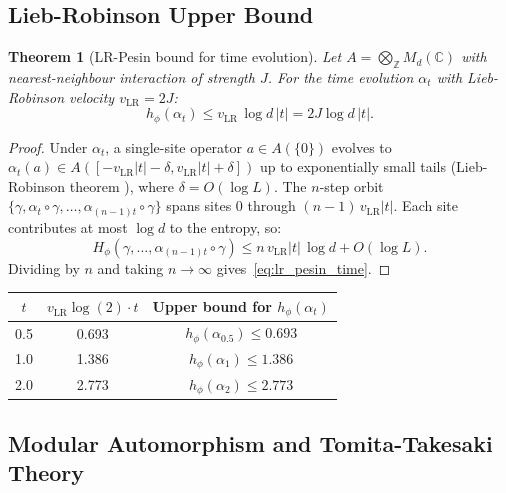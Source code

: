 \documentclass[12pt,a4paper]{article}
\newtheorem{theorem}{Theorem}[section]
\newcommand{\CC}{\mathbb{C}}
\newcommand{\ZZ}{\mathbb{Z}}
\newcommand{\Md}{M_d(\CC)}
\newcommand{\Hphi}{H_{\phi}}
\begin{document}
\subsection{Lieb-Robinson Upper Bound}

\begin{theorem}[LR-Pesin bound for time evolution]\label{thm:lr_pesin_time}
Let $A=\bigotimes_\ZZ\Md$ with nearest-neighbour interaction of strength $J$.
For the time evolution $\alpha_t$ with Lieb-Robinson velocity $v_\mathrm{LR}=2J$:
\begin{equation}\label{eq:lr_pesin_time}
  h_\phi(\alpha_t) \le v_\mathrm{LR}\,\log d\,|t|
  = 2J\log d\,|t|.
\end{equation}
\end{theorem}

\begin{proof}
Under $\alpha_t$, a single-site operator $a\in A(\{0\})$ evolves to
$\alpha_t(a)\in A([-v_\mathrm{LR}|t|-\delta, v_\mathrm{LR}|t|+\delta])$
up to exponentially small tails (Lieb-Robinson theorem \cite{lieb72}),
where $\delta=O(\log L)$.
The $n$-step orbit
$\{\gamma,\alpha_t\circ\gamma,\ldots,\alpha_{(n-1)t}\circ\gamma\}$
spans sites $0$ through $(n-1)\,v_\mathrm{LR}|t|$.
Each site contributes at most $\log d$ to the entropy, so:
\begin{equation}
  \Hphi(\gamma,\ldots,\alpha_{(n-1)t}\circ\gamma)
  \le n\,v_\mathrm{LR}|t|\,\log d + O(\log L).
\end{equation}
Dividing by $n$ and taking $n\to\infty$ gives~\eqref{eq:lr_pesin_time}.
\end{proof}

\begin{center}
\begin{tabular}{@{}ccc@{}}
\toprule
$t$ & $v_\mathrm{LR}\log(2)\cdot t$ & Upper bound for $h_\phi(\alpha_t)$ \\
\midrule
0.5 & 0.693 & $h_\phi(\alpha_{0.5})\le 0.693$ \\
1.0 & 1.386 & $h_\phi(\alpha_1)\le 1.386$ \\
2.0 & 2.773 & $h_\phi(\alpha_2)\le 2.773$ \\
\bottomrule
\end{tabular}
\end{center}

\subsection{Modular Automorphism and Tomita-Takesaki Theory}
\end{document}
